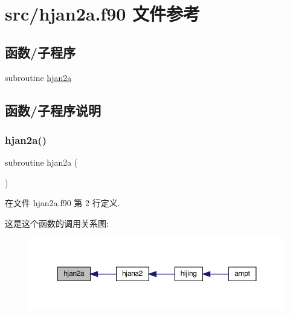 \hypertarget{hjan2a_8f90}{}\section{src/hjan2a.f90 文件参考}
\label{hjan2a_8f90}
\subsection*{函数/子程序}
\begin{DoxyCompactItemize}
\item 
subroutine \mbox{\hyperlink{hjan2a_8f90_ada6e530d085469da1415c67a08f6af48}{hjan2a}}
\end{DoxyCompactItemize}


\subsection{函数/子程序说明}
\mbox{\label{hjan2a_8f90_ada6e530d085469da1415c67a08f6af48}} 
\subsubsection{\texorpdfstring{hjan2a()}{hjan2a()}}
{\footnotesize\ttfamily subroutine hjan2a (\begin{DoxyParamCaption}{ }\end{DoxyParamCaption})}



在文件 hjan2a.\+f90 第 2 行定义.

这是这个函数的调用关系图\+:
\nopagebreak
\begin{figure}[H]
\begin{center}
\leavevmode
\includegraphics[width=350pt]{hjan2a_8f90_ada6e530d085469da1415c67a08f6af48_icgraph}
\end{center}
\end{figure}
